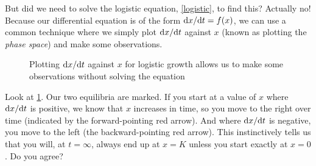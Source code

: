 \documentclass[12pt,a4paper,openany,twoside]{book}
\renewcommand{\d}{{\mathrm d}}
\newcommand{\fd}[2]{\mathchoice{\frac{\d #1}{\d #2}}{\d #1/\d #2}{\d #1/\d #2}{\d #1/\d #2}}
\begin{document}
But did we need to solve the logistic equation, \cref{logistic}, to find this? Actually no! Because our differential equation is of the form $\fd{x}{t} = f(x)$, we can use a common technique where we simply plot $\fd{x}{t}$ against $x$ (known as plotting the \emph{phase space}) and make some observations. 

\begin{figure}%
	\centering
	
	\caption[Plot of $\fd{x}{t}$ against $x$ for logistic growth]{Plotting $\fd{x}{t}$ against $x$ for logistic growth allows us to make some observations without solving the equation}
	\label{fig:logistic-growth-deriv}
\end{figure}%

Look at \cref{fig:logistic-growth-deriv}. Our two equilibria are marked. If you start at a value of $x$ where $\fd{x}{t}$ is positive, we know that $x$ increases in time, so you move to the right over time (indicated by the forward-pointing red arrow). And where $\fd{x}{t}$ is negative, you move to the left (the backward-pointing red arrow). This instinctively tells us that you will, at $t=\infty$, always end up at $x=K$ unless you start exactly at $x=0$. Do you agree?


\end{document}
